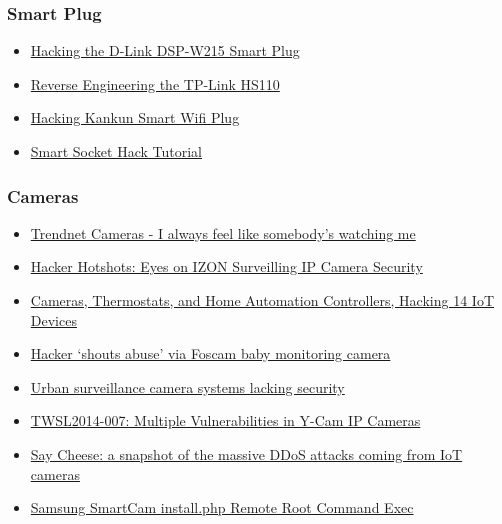 \hypertarget{smart-plug}{%
\subsubsection{Smart Plug}\label{smart-plug}}

\begin{itemize}
\tightlist
\item
  \href{http://www.devttys0.com/2014/05/hacking-the-d-link-dsp-w215-smart-plug/}{Hacking
  the D-Link DSP-W215 Smart Plug}
\item
  \href{https://www.softscheck.com/en/reverse-engineering-tp-link-hs110/}{Reverse
  Engineering the TP-Link HS110}
\item
  \href{http://www.anites.com/2015/01/hacking-kankun-smart-wifi-plug.html}{Hacking
  Kankun Smart Wifi Plug}
\item
  \href{http://souliss.net/media/smart-socket-hack/}{Smart Socket Hack
  Tutorial}
\end{itemize}

\hypertarget{cameras}{%
\subsubsection{Cameras}\label{cameras}}

\begin{itemize}
\tightlist
\item
  \href{http://console-cowboys.blogspot.com/2012/01/trendnet-cameras-i-always-feel-like.html}{Trendnet
  Cameras - I always feel like somebody's watching me}
\item
  \href{https://www.concise-courses.com/security/izon-hacking/}{Hacker
  Hotshots: Eyes on IZON Surveilling IP Camera Security}
\item
  \href{https://www.iotvillage.org/slides_DC23/IoT11-slides.pdf}{Cameras,
  Thermostats, and Home Automation Controllers, Hacking 14 IoT Devices}
\item
  \href{http://www.bbc.com/news/technology-23693460}{Hacker `shouts
  abuse' via Foscam baby monitoring camera}
\item
  \href{https://blog.kaspersky.com/urban-surveillance-not-secure/8901/}{Urban
  surveillance camera systems lacking security}
\item
  \href{https://www.trustwave.com/Resources/Security-Advisories/Advisories/TWSL2014-007/?fid=3850}{TWSL2014-007:
  Multiple Vulnerabilities in Y-Cam IP Cameras}
\item
  \href{https://blog.cloudflare.com/say-cheese-a-snapshot-of-the-massive-ddos-attacks-coming-from-iot-cameras/}{Say
  Cheese: a snapshot of the massive DDoS attacks coming from IoT
  cameras}
\item
  \href{https://www.exploitee.rs/index.php/Samsung_SmartCam\%E2\%80\%8B}{Samsung
  SmartCam install.php Remote Root Command Exec}
\end{itemize}

